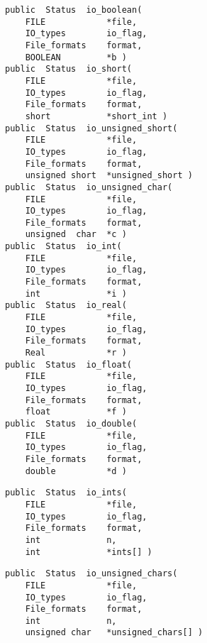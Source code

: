 
{\bf\begin{verbatim}
public  Status  io_boolean(
    FILE            *file,
    IO_types        io_flag,
    File_formats    format,
    BOOLEAN         *b )
public  Status  io_short(
    FILE            *file,
    IO_types        io_flag,
    File_formats    format,
    short           *short_int )
public  Status  io_unsigned_short(
    FILE            *file,
    IO_types        io_flag,
    File_formats    format,
    unsigned short  *unsigned_short )
public  Status  io_unsigned_char(
    FILE            *file,
    IO_types        io_flag,
    File_formats    format,
    unsigned  char  *c )
public  Status  io_int(
    FILE            *file,
    IO_types        io_flag,
    File_formats    format,
    int             *i )
public  Status  io_real(
    FILE            *file,
    IO_types        io_flag,
    File_formats    format,
    Real            *r )
public  Status  io_float(
    FILE            *file,
    IO_types        io_flag,
    File_formats    format,
    float           *f )
public  Status  io_double(
    FILE            *file,
    IO_types        io_flag,
    File_formats    format,
    double          *d )
\end{verbatim}}


{\bf\begin{verbatim}
public  Status  io_ints(
    FILE            *file,
    IO_types        io_flag,
    File_formats    format,
    int             n,
    int             *ints[] )
\end{verbatim}}


{\bf\begin{verbatim}
public  Status  io_unsigned_chars(
    FILE            *file,
    IO_types        io_flag,
    File_formats    format,
    int             n,
    unsigned char   *unsigned_chars[] )
\end{verbatim}}



